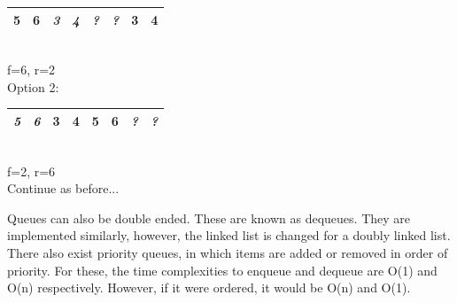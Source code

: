 \documentclass[nobib]{tufte-handout}
\begin{document}
\begin{table}
\begin{tabular}{|c|c|c|c|c|c|c|c|}
        \hline
        \cellcolor{cyan}\textbf{5}&\cellcolor{cyan}\textbf{6}&\textit{3}&\textit{4}&\textit{?}&\textit{?}&\cellcolor{cyan}\textbf{3}&\cellcolor{cyan}\textbf{4}\\
        \hline
    \end{tabular}\\
    f=6, r=2\\
    Option 2:\\
    \begin{tabular}{|c|c|c|c|c|c|c|c|}
        \hline
        \textit{5}&\textit{6}&\cellcolor{cyan}\textbf{3}&\cellcolor{cyan}\textbf{4}&\cellcolor{cyan}\textbf{5}&\cellcolor{cyan}\textbf{6}&\textit{?}&\textit{?}\\
        \hline
    \end{tabular}\\
    f=2, r=6\\
    Continue as before...
\end{table}
Queues can also be double ended. These are known as dequeues. They are implemented similarly, however, the linked list is changed for a doubly linked list. \\
There also exist priority queues, in which items are added or removed in order of priority. For these, the time complexities to enqueue and dequeue are O(1) and O(n) respectively. However, if it were ordered, it would be O(n) and O(1).\\
\end{document}
